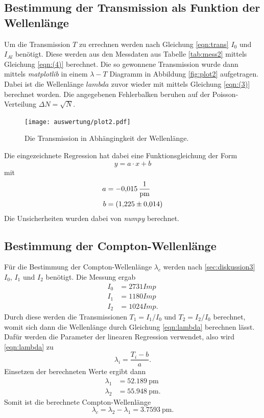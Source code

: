 \subsection{Bestimmung der Transmission als Funktion der Wellenlänge}
\label{sec:transmission}
Um die Transmission $T$ zu errechnen werden nach Gleichung \eqref{eqn:trans} $I_{0}$ und $I_{Al}$ benötigt. Diese werden aus den Messdaten
aus Tabelle \ref{tab:mess2} mittels Gleichung \eqref{eqn:(4)} berechnet. Die so gewonnene Transmission wurde dann mittels 
\textit{matplotlib} \cite{matplotlib} in einem $\lambda-T$ Diagramm in Abbildung \ref{fig:plot2} aufgetragen. Dabei ist die Wellenlänge
$lambda$ zuvor wieder mit mittels Gleichung \eqref{eqn:(3)} berechnet worden. Die angegebenen Fehlerbalken beruhen auf der Poisson-Verteilung
$\Delta N=\sqrt{N}$.
\begin{figure}[H]
    \centering
    \texttt{[image: auswertung/plot2.pdf]}
    \caption{Die Transmission in Abhängingkeit der Wellenlänge.}
    \label{fig:plot1}
\end{figure}
\noindent
Die eingezeichnete Regression hat dabei eine Funktionsgleichung der Form
  \begin{equation*}
      y=a\cdot x+b \label{eqn:gerade}
  \end{equation*} 
mit
  \begin{align*}
    a &= \SI{-0.015 \pm 0.000}{\per\pico\metre}\\
    b &= \SI{1.225 \pm 0.014}.
  \end{align*}
Die Unsicherheiten wurden dabei von  \textit{numpy} \cite{numpy} berechnet.

\subsection{Bestimmung der Compton-Wellenlänge}
\label{sec:compton}
Für die Bestimmung der Compton-Wellenlänge $\lambda_c$ werden nach \ref{sec:diskussion3} $I_0$, $I_1$ und $I_2$ benötigt.
Die Messung ergab
\begin{align*}
    I_0 &= 2731 \si{Imp}\\
    I_1 &= 1180 \si{Imp}\\
    I_2 &= 1024 \si{Imp}.
\end{align*}  
Durch diese werden die Transmissionen $T_1=I_1/I_0$ und  $T_2=I_2/I_0$ berechnet, womit sich dann die Wellenlänge durch Gleichung
\eqref{eqn:lambda} berechnen lässt. Dafür werden die Parameter der linearen Regression verwendet, also wird \eqref{eqn:lambda} zu
\begin{equation*}
    \lambda_i = \frac{T_i -b}{a}. 
\end{equation*}
Einsetzen der berechneten Werte ergibt dann
\begin{align*}
    \lambda_1 &= \SI{52.189}{\pico\metre}\\
    \lambda_2 &= \SI{55.948}{\pico\metre}.
\end{align*}
Somit ist die berechnete Compton-Wellenlänge
\begin{equation*}
    \lambda_c=\lambda_2-\lambda_1= \SI{3.7593}{\pico\metre}.
\end{equation*}